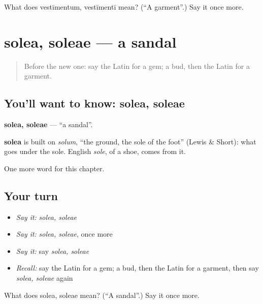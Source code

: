 \begin{tcolorbox}[breakable,colback=teal!4,colframe=teal!35!black,title={Before you move on}]
What does vestīmentum, vestīmentī mean? (\textquotedblleft{}A garment\textquotedblright{}.) Say it once more.
\end{tcolorbox}
\section[solea, soleae]{solea, soleae — a sandal}

\label{lesson:LA-C225-solea}



\begin{quote}
Before the new one: say the Latin for a gem; a bud, then the Latin for a garment.
\end{quote}

\subsection*{You'll want to know: solea, soleae}
\textbf{solea, soleae} — \textquotedblleft{}a sandal\textquotedblright{}.

\begin{cousinweb}
\textbf{solea} is built on \emph{solum}, \textquotedblleft{}the ground, the sole of the foot\textquotedblright{} (Lewis \& Short): what goes under the sole. English \emph{sole}, of a shoe, comes from it.
\end{cousinweb}

\begin{grammarlens}[title={What you've built}]
One more word for this chapter.
\end{grammarlens}

\subsection*{Your turn}
\begin{itemize}
\raggedright
  \item \emph{Say it:} \emph{solea, soleae}
  \item \emph{Say it:} \emph{solea, soleae}, once more
  \item \emph{Say it:} say \emph{solea, soleae}
  \item \emph{Recall:} say the Latin for a gem; a bud, then the Latin for a garment, then say \emph{solea, soleae} again
\end{itemize}

\begin{tcolorbox}[breakable,colback=teal!4,colframe=teal!35!black,title={Before you move on}]
What does solea, soleae mean? (\textquotedblleft{}A sandal\textquotedblright{}.) Say it once more.
\end{tcolorbox}
